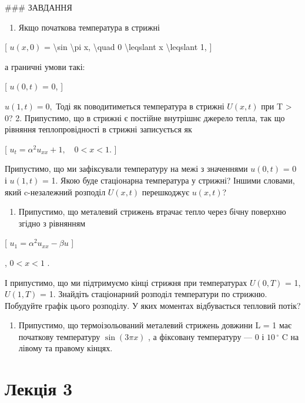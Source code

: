 \documentclass[
]{article}
\providecommand{\tightlist}{%
  \setlength{\itemsep}{0pt}\setlength{\parskip}{0pt}}
\begin{document}
\#\#\# ЗАВДАННЯ

\begin{enumerate}
\def\labelenumi{\arabic{enumi}.}
\tightlist
\item
  Якщо початкова температура в стрижні
\end{enumerate}

{[} \(u(x, 0)\) = \textbackslash sin \textbackslash pi x,
\textbackslash quad 0 \textbackslash leqslant x \textbackslash leqslant
1, {]}

а граничні умови такі:

{[} \(u(0, t)\) = 0, {]}

\(u(1, t) = 0,\) Тоді як поводитиметься температура в стрижні
\(U(x, t)\) при T \textgreater{} 0? 2. Припустимо, що в стрижні є
постійне внутрішнє джерело тепла, так що рівняння теплопровідності в
стрижні записується як

{[} \(u_t = \alpha^2 u_{xx} + 1, \quad 0 < x < 1\). {]}

Припустимо, що ми зафіксували температуру на межі з значеннями
\(u(0, t)\) = 0 і \(u(1, t)\) = 1. Якою буде стаціонарна температура у
стрижні? Іншими словами, який c-незалежний розподіл \(U(x, t)\)
перешкоджує \(u(x, t)\)?

\begin{enumerate}
\def\labelenumi{\arabic{enumi}.}
\setcounter{enumi}{2}
\tightlist
\item
  Припустимо, що металевий стрижень втрачає тепло через бічну поверхню
  згідно з рівнянням
\end{enumerate}

{[} \(u_1 = \alpha^2 u_{xx} - \beta u\) {]}

, \(0 < x < 1\) .

І припустимо, що ми підтримуємо кінці стрижня при температурах
\(U(0, T)\) = 1, \(U(1, T)\) = 1. Знайдіть стаціонарний розподіл
температури по стрижню. Побудуйте графік цього розподілу. У яких
моментах відбувається тепловий потік?

\begin{enumerate}
\def\labelenumi{\arabic{enumi}.}
\setcounter{enumi}{3}
\tightlist
\item
  Припустимо, що термоізольований металевий стрижень довжини L = 1 має
  початкову температуру \(\sin(3\pi x)\) , а фіксовану температуру --- 0
  і \(10\,^{\circ}\) C на лівому та правому кінцях.
\end{enumerate}

\section{Лекція 3}\label{ux43bux435ux43aux446ux456ux44f-3}
\end{document}
